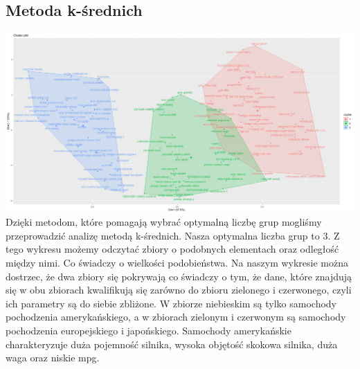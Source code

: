 \documentclass{article}
\begin{document}
    \subsection{Metoda k-średnich}    
        \includegraphics[width = \textwidth]{kmeans_fig}
        Dzięki metodom, które pomagają wybrać optymalną liczbę grup mogliśmy przeprowadzić analizę metodą k-średnich. 
        Nasza optymalna liczba grup to 3. Z tego wykresu możemy odczytać zbiory o podobnych elementach oraz odległość między nimi. 
        Co świadczy o wielkości podobieństwa. Na naszym wykresie można dostrzec, że dwa zbiory się pokrywają co świadczy o tym, że dane, 
        które znajdują się w obu zbiorach kwalifikują się zarówno do zbioru zielonego i czerwonego, czyli ich parametry są do siebie zbliżone.
        \newline\newline
        W zbiorze niebieskim są tylko samochody pochodzenia amerykańskiego, a w zbiorach zielonym i czerwonym są samochody pochodzenia 
        europejskiego i japońskiego. Samochody amerykańskie charakteryzuje duża pojemność silnika, wysoka objętość skokowa silnika, duża 
        waga oraz niskie mpg.

        
\end{document}
